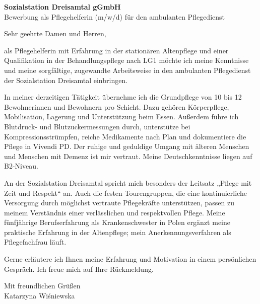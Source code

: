 \documentclass[11pt,a4paper]{article}
\begin{document}
{\bfseries Sozialstation Dreisamtal gGmbH}\\
Bewerbung als Pflegehelferin (m/w/d) für den ambulanten Pflegedienst

Sehr geehrte Damen und Herren,

als Pflegehelferin mit Erfahrung in der stationären Altenpflege und einer Qualifikation in der Behandlungspflege nach LG1 möchte ich meine Kenntnisse und meine sorgfältige, zugewandte Arbeitsweise in den ambulanten Pflegedienst der Sozialstation Dreisamtal einbringen.

In meiner derzeitigen Tätigkeit übernehme ich die Grundpflege von 10 bis 12 Bewohnerinnen und Bewohnern pro Schicht. Dazu gehören Körperpflege, Mobilisation, Lagerung und Unterstützung beim Essen. Außerdem führe ich Blutdruck- und Blutzuckermessungen durch, unterstütze bei Kompressionsstrümpfen, reiche Medikamente nach Plan und dokumentiere die Pflege in Vivendi PD. Der ruhige und geduldige Umgang mit älteren Menschen und Menschen mit Demenz ist mir vertraut. Meine Deutschkenntnisse liegen auf B2-Niveau.

An der Sozialstation Dreisamtal spricht mich besonders der Leitsatz „Pflege mit Zeit und Respekt“ an. Auch die festen Tourengruppen, die eine kontinuierliche Versorgung durch möglichst vertraute Pflegekräfte unterstützen, passen zu meinem Verständnis einer verlässlichen und respektvollen Pflege. Meine fünfjährige Berufserfahrung als Krankenschwester in Polen ergänzt meine praktische Erfahrung in der Altenpflege; mein Anerkennungsverfahren als Pflegefachfrau läuft.

Gerne erläutere ich Ihnen meine Erfahrung und Motivation in einem persönlichen Gespräch. Ich freue mich auf Ihre Rückmeldung.

Mit freundlichen Grüßen\\
Katarzyna Wiśniewska
\end{document}
